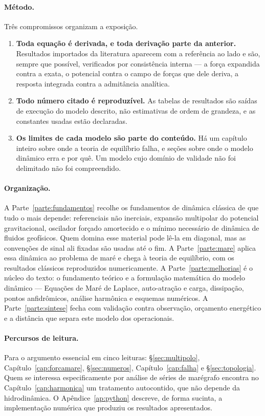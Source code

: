 \documentclass[11pt,a4paper,oneside]{report}
\theoremstyle{definition}
\theoremstyle{plain}
\theoremstyle{remark}
\begin{document}
\paragraph{Método.} Três compromissos organizam a exposição.

\begin{enumerate}
\item \textbf{Toda equação é derivada, e toda derivação parte da anterior.}
  Resultados importados da literatura aparecem com a referência ao lado e são,
  sempre que possível, verificados por consistência interna — a força expandida
  contra a exata, o potencial contra o campo de forças que dele deriva, a
  resposta integrada contra a admitância analítica.
\item \textbf{Todo número citado é reproduzível.} As tabelas de resultados são
  saídas de execução do modelo descrito, não estimativas de ordem de grandeza,
  e as constantes usadas estão declaradas.
\item \textbf{Os limites de cada modelo são parte do conteúdo.} Há um capítulo
  inteiro sobre onde a teoria de equilíbrio falha, e seções sobre onde o modelo
  dinâmico erra e por quê. Um modelo cujo domínio de validade não foi
  delimitado não foi compreendido.
\end{enumerate}

\paragraph{Organização.} A Parte~\ref{parte:fundamentos} recolhe os fundamentos
de dinâmica clássica de que tudo o mais depende: referenciais não inerciais,
expansão multipolar do potencial gravitacional, oscilador forçado amortecido e o
mínimo necessário de dinâmica de fluidos geofísicos. Quem domina esse material
pode lê-la em diagonal, mas as convenções de sinal ali fixadas são usadas até o
fim. A Parte~\ref{parte:mare} aplica essa dinâmica ao problema de maré e chega à
teoria de equilíbrio, com os resultados clássicos reproduzidos numericamente. A
Parte~\ref{parte:melhorias} é o núcleo do texto: o fundamento teórico e a
formulação matemática do modelo dinâmico — Equações de Maré de Laplace,
auto-atração e carga, dissipação, pontos anfidrômicos, análise harmônica e
esquemas numéricos. A Parte~\ref{parte:sintese} fecha com validação contra
observação, orçamento energético e a distância que separa este modelo dos
operacionais.

\paragraph{Percursos de leitura.} Para o argumento essencial em cinco leituras:
\S\ref{sec:multipolo}, Capítulo~\ref{cap:forcamare}, \S\ref{sec:numeros},
Capítulo~\ref{cap:falha} e \S\ref{sec:topologia}. Quem se interessa
especificamente por análise de séries de marégrafo encontra no
Capítulo~\ref{cap:harmonica} um tratamento autocontido, que não depende da
hidrodinâmica. O Apêndice~\ref{ap:python} descreve, de forma sucinta, a
implementação numérica que produziu os resultados apresentados.
\end{document}
